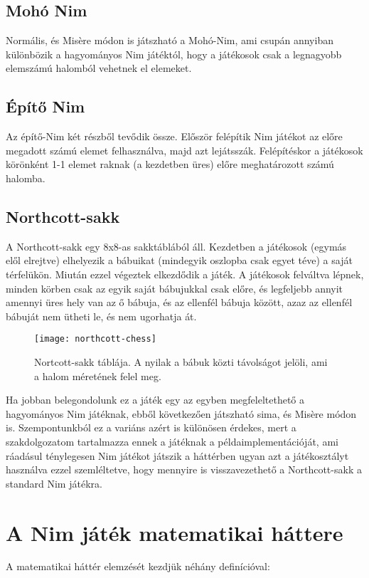 \subsection{Mohó Nim}
Normális, és Misère módon is játszható a Mohó-Nim, ami csupán annyiban különbözik a hagyományos Nim játéktól, hogy a játékosok csak a legnagyobb elemszámú halomból vehetnek el elemeket.

\subsection{Építő Nim}
Az építő-Nim két részből tevődik össze. Először felépítik Nim játékot az előre megadott számú elemet felhasználva, majd azt lejátsszák. Felépítéskor a játékosok körönként 1-1 elemet raknak (a kezdetben üres) előre meghatározott számú halomba.

\subsection{Northcott-sakk}
A Northcott-sakk egy 8x8-as sakktáblából áll. Kezdetben a játékosok (egymás elől elrejtve) elhelyezik a bábuikat (mindegyik oszlopba csak egyet téve) a saját térfelükön. Miután ezzel végeztek elkezdődik a játék. A játékosok felváltva lépnek, minden körben csak az egyik saját bábujukkal csak előre, és legfeljebb annyit amennyi üres hely van az ő bábuja, és az ellenfél bábuja között, azaz az ellenfél bábuját nem ütheti le, és nem ugorhatja át.\ujsor

\begin{figure}[h]
	\texttt{[image: northcott-chess]}
	\centering
	\caption{Nortcott-sakk táblája. A nyilak a bábuk közti távolságot jelöli, ami a halom méretének felel meg.}
\end{figure}

Ha jobban belegondolunk ez a játék egy az egyben megfeleltethető a hagyományos Nim játéknak, ebből következően játszható sima, és Misère módon is.\ujsor 
Szempontunkból ez a variáns azért is különösen érdekes, mert a szakdolgozatom tartalmazza ennek a játéknak a példaimplementációját, ami ráadásul ténylegesen Nim játékot játszik a háttérben ugyan azt a játékosztályt használva ezzel szemléltetve, hogy mennyire is visszavezethető a Northcott-sakk a standard Nim játékra.

\section{A Nim játék matematikai háttere}
A matematikai háttér elemzését kezdjük néhány definícióval:

